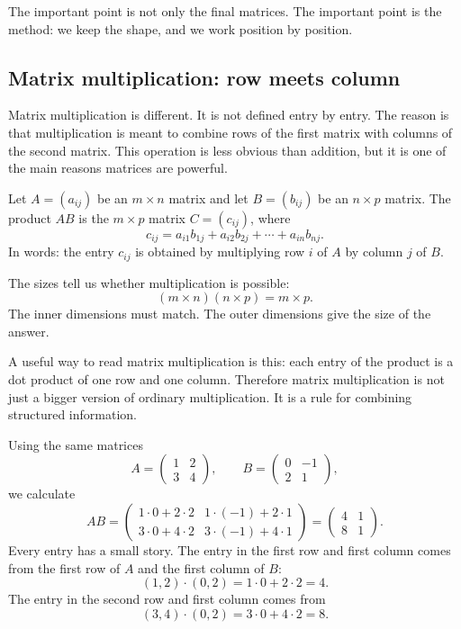 The important point is not only the final matrices. The important point is the method: we keep the shape, and we work position by position.

\subsection{Matrix multiplication: row meets column}

Matrix multiplication is different. It is not defined entry by entry. The reason is that multiplication is meant to combine rows of the first matrix with columns of the second matrix. This operation is less obvious than addition, but it is one of the main reasons matrices are powerful.

\begin{definitionbox}
Let \(A=(a_{ij})\) be an \(m\times n\) matrix and let \(B=(b_{ij})\) be an \(n\times p\) matrix. The product \(AB\) is the \(m\times p\) matrix \(C=(c_{ij})\), where
\[
c_{ij}=a_{i1}b_{1j}+a_{i2}b_{2j}+\cdots+a_{in}b_{nj}.
\]
In words: the entry \(c_{ij}\) is obtained by multiplying row \(i\) of \(A\) by column \(j\) of \(B\).
\end{definitionbox}

The sizes tell us whether multiplication is possible:
\[
(m\times n)(n\times p)=m\times p.
\]
The inner dimensions must match. The outer dimensions give the size of the answer.

\begin{remarkbox}
A useful way to read matrix multiplication is this: each entry of the product is a dot product of one row and one column. Therefore matrix multiplication is not just a bigger version of ordinary multiplication. It is a rule for combining structured information.
\end{remarkbox}

\begin{examplebox}
Using the same matrices
\[
A=\begin{pmatrix}1 & 2\\ 3 & 4\end{pmatrix},
\qquad
B=\begin{pmatrix}0 & -1\\ 2 & 1\end{pmatrix},
\]
we calculate
\[
AB=
\begin{pmatrix}
1\cdot 0+2\cdot 2 & 1\cdot (-1)+2\cdot 1\\
3\cdot 0+4\cdot 2 & 3\cdot (-1)+4\cdot 1
\end{pmatrix}
=
\begin{pmatrix}
4 & 1\\
8 & 1
\end{pmatrix}.
\]
Every entry has a small story. The entry in the first row and first column comes from the first row of \(A\) and the first column of \(B\):
\[
(1,2)\cdot (0,2)=1\cdot 0+2\cdot 2=4.
\]
The entry in the second row and first column comes from
\[
(3,4)\cdot (0,2)=3\cdot 0+4\cdot 2=8.
\]
\end{examplebox}

